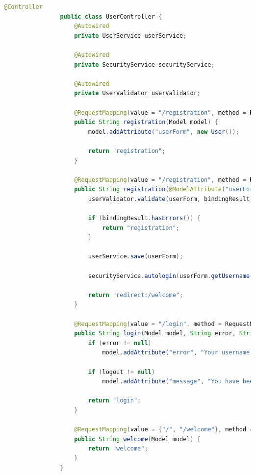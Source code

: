             \begin{lstlisting}[language = java]
                @Controller
                public class UserController {
                    @Autowired
                    private UserService userService;
                
                    @Autowired
                    private SecurityService securityService;
                
                    @Autowired
                    private UserValidator userValidator;
                
                    @RequestMapping(value = "/registration", method = RequestMethod.GET)
                    public String registration(Model model) {
                        model.addAttribute("userForm", new User());
                
                        return "registration";
                    }
                
                    @RequestMapping(value = "/registration", method = RequestMethod.POST)
                    public String registration(@ModelAttribute("userForm") User userForm, BindingResult bindingResult, Model model) {
                        userValidator.validate(userForm, bindingResult);
                
                        if (bindingResult.hasErrors()) {
                            return "registration";
                        }
                
                        userService.save(userForm);
                
                        securityService.autologin(userForm.getUsername(), userForm.getPasswordConfirm());
                
                        return "redirect:/welcome";
                    }
                
                    @RequestMapping(value = "/login", method = RequestMethod.GET)
                    public String login(Model model, String error, String logout) {
                        if (error != null)
                            model.addAttribute("error", "Your username and password is invalid.");
                
                        if (logout != null)
                            model.addAttribute("message", "You have been logged out successfully.");
                
                        return "login";
                    }
                
                    @RequestMapping(value = {"/", "/welcome"}, method = RequestMethod.GET)
                    public String welcome(Model model) {
                        return "welcome";
                    }
                }
            \end{lstlisting}
